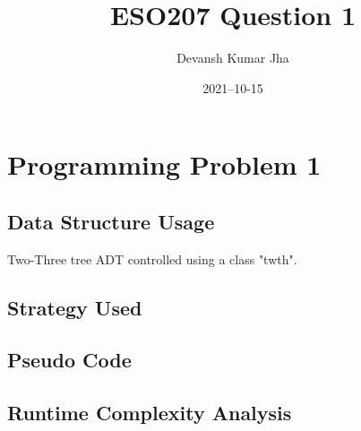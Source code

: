 \documentclass[20pt]{article}
\title{ESO207 Question 1}
\author{Devansh Kumar Jha}
\date{2021–10-15}
\begin{document}
\maketitle


\section{Programming Problem 1}

\subsection{Data Structure Usage}
Two-Three tree ADT controlled using a class "twth".

\subsection{Strategy Used}

\subsection{Pseudo Code}

\subsection{Runtime Complexity Analysis}
\end{document}
